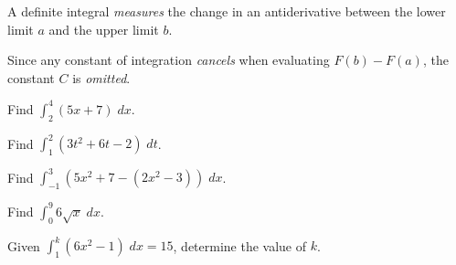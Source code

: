 \documentclass[
  11pt,
  openany]{book}
\begin{document}
A definite integral \emph{measures} the change in an antiderivative between the lower limit \(a\) and the upper limit \(b\).

Since any constant of integration \textit{cancels} when evaluating \(F(b)-F(a)\), the constant \(C\) is \textit{omitted}.

\begin{tcolorbox}[title=Example 1,colback=RoyalBlue!2, colframe=RoyalBlue]

Find $\displaystyle{\int_2^4 \left(5x+7\right)}\;dx$.


\vspace{5cm}

\end{tcolorbox}

\begin{tcolorbox}[title=Example 2,colback=RoyalBlue!2, colframe=RoyalBlue]

Find $\displaystyle{\int_1^2 \left(3t^2+6t-2\right)}\;dt$.


\vspace{7cm}

\end{tcolorbox}

\pagebreak

\begin{tcolorbox}[title=Example 3,colback=RoyalBlue!2, colframe=RoyalBlue]

Find $\displaystyle{\int_{-1}^3 \left(5x^2+7-(2x^2-3)\right)}\;dx$.


\vspace{6.3cm}

\end{tcolorbox}

\begin{tcolorbox}[title=Example 4,colback=RoyalBlue!2, colframe=RoyalBlue]

Find $\displaystyle{\int_{0}^9 6\sqrt{x}}\;dx$.


\vspace{5.3cm}

\end{tcolorbox}

\begin{tcolorbox}[title=Example 5,colback=RoyalBlue!2, colframe=RoyalBlue]

Given $\displaystyle{\int_{1}^k \left(6x^2-1\right)}\;dx=15$, determine the value of $k$.


\vspace{6.3cm}

\end{tcolorbox}
\end{document}
